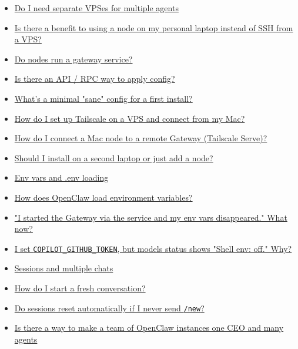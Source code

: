 \begin{itemize}
  \item \href{\#do-i-need-separate-vpses-for-multiple-agents}{Do I need separate VPSes for multiple agents}
  \item \href{\#is-there-a-benefit-to-using-a-node-on-my-personal-laptop-instead-of-ssh-from-a-vps}{Is there a benefit to using a node on my personal laptop instead of SSH from a VPS?}
  \item \href{\#do-nodes-run-a-gateway-service}{Do nodes run a gateway service?}
  \item \href{\#is-there-an-api-rpc-way-to-apply-config}{Is there an API / RPC way to apply config?}
  \item \href{\#whats-a-minimal-sane-config-for-a-first-install}{What's a minimal "sane" config for a first install?}
  \item \href{\#how-do-i-set-up-tailscale-on-a-vps-and-connect-from-my-mac}{How do I set up Tailscale on a VPS and connect from my Mac?}
  \item \href{\#how-do-i-connect-a-mac-node-to-a-remote-gateway-tailscale-serve}{How do I connect a Mac node to a remote Gateway (Tailscale Serve)?}
  \item \href{\#should-i-install-on-a-second-laptop-or-just-add-a-node}{Should I install on a second laptop or just add a node?}
  \item \href{\#env-vars-and-env-loading}{Env vars and .env loading}
  \item \href{\#how-does-openclaw-load-environment-variables}{How does OpenClaw load environment variables?}
  \item \href{\#i-started-the-gateway-via-the-service-and-my-env-vars-disappeared-what-now}{"I started the Gateway via the service and my env vars disappeared." What now?}
  \item \href{\#i-set-copilotgithubtoken-but-models-status-shows-shell-env-off-why}{I set \texttt{COPILOT\_GITHUB\_TOKEN}, but models status shows "Shell env: off." Why?}
  \item \href{\#sessions-and-multiple-chats}{Sessions and multiple chats}
  \item \href{\#how-do-i-start-a-fresh-conversation}{How do I start a fresh conversation?}
  \item \href{\#do-sessions-reset-automatically-if-i-never-send-new}{Do sessions reset automatically if I never send \texttt{/new}?}
  \item \href{\#is-there-a-way-to-make-a-team-of-openclaw-instances-one-ceo-and-many-agents}{Is there a way to make a team of OpenClaw instances one CEO and many agents}

\end{itemize}
